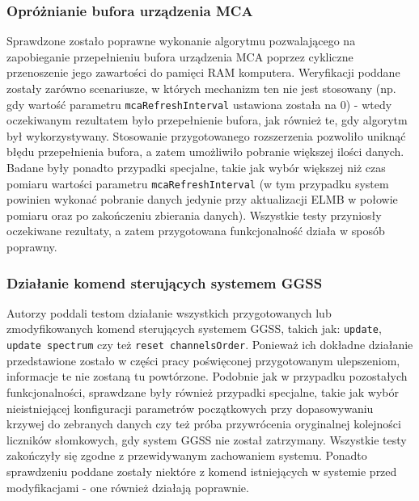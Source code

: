 

\subsubsection*{Opróżnianie bufora urządzenia MCA}
Sprawdzone zostało poprawne wykonanie algorytmu pozwalającego na zapobieganie przepełnieniu bufora urządzenia MCA poprzez cykliczne przenoszenie jego zawartości do pamięci RAM komputera. Weryfikacji poddane zostały zarówno scenariusze, w których mechanizm ten nie jest stosowany (np. gdy wartość parametru \lstinline{mcaRefreshInterval} ustawiona została na 0) - wtedy oczekiwanym rezultatem było przepełnienie bufora, jak również te, gdy algorytm był wykorzystywany. Stosowanie przygotowanego rozszerzenia pozwoliło uniknąć błędu przepełnienia bufora, a zatem umożliwiło pobranie większej ilości danych. Badane były ponadto przypadki specjalne, takie jak wybór większej niż czas pomiaru wartości parametru \lstinline{mcaRefreshInterval} (w tym przypadku system powinien wykonać pobranie danych jedynie przy aktualizacji ELMB w połowie pomiaru oraz po zakończeniu zbierania danych). Wszystkie testy przyniosły oczekiwane rezultaty, a zatem przygotowana funkcjonalność działa w sposób poprawny.

\subsubsection*{Działanie komend sterujących systemem GGSS}
Autorzy poddali testom działanie wszystkich przygotowanych lub zmodyfikowanych komend sterujących systemem GGSS, takich jak: \lstinline{update}, \lstinline{update spectrum} czy też \lstinline{reset channelsOrder}. Ponieważ ich dokładne działanie przedstawione zostało w części pracy poświęconej przygotowanym ulepszeniom, informacje te nie zostaną tu powtórzone. Podobnie jak w przypadku pozostałych funkcjonalności, sprawdzane były również przypadki specjalne, takie jak wybór nieistniejącej konfiguracji parametrów początkowych przy dopasowywaniu krzywej do zebranych danych czy też próba przywrócenia oryginalnej kolejności liczników słomkowych, gdy system GGSS nie został zatrzymany. Wszystkie testy zakończyły się zgodne z przewidywanym zachowaniem systemu. Ponadto sprawdzeniu poddane zostały niektóre z komend istniejących w systemie przed modyfikacjami - one również działają poprawnie.


